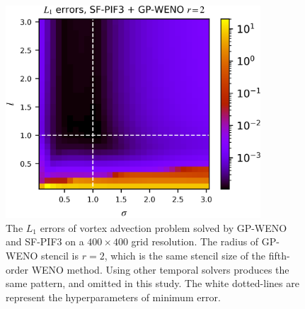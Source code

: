\begin{figure}
    \centering
    \includegraphics[width=0.85\textwidth]{fig/hp_cmap_gp2_sf3.png}
    \caption{The \( L_{1} \) errors of vortex advection problem solved by
        GP-WENO and SF-PIF3 on a \( 400 \times 400 \) grid resolution.
        The radius of GP-WENO stencil is \( r=2 \), which is the same
        stencil size of the fifth-order WENO method.
        Using other temporal solvers produces the same pattern,
        and omitted in this study.
        The white dotted-lines are represent the
        hyperparameters of minimum error.
    }\label{fig:gp_hp_cmap}
\end{figure}

